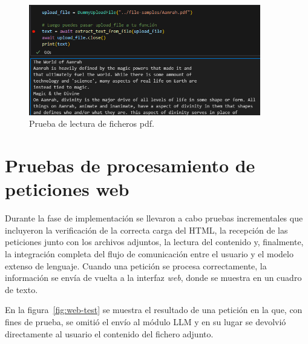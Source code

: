 \begin{figure}[htbp]
	\centering
	\includegraphics[width=0.9\textwidth]{./Figures/file-read-test-pdf.png}
	\caption{Prueba de lectura de ficheros pdf.}
	\label{fig:pdf-read-test}
\end{figure}

\pagebreak
\section{Pruebas de procesamiento de peticiones web}
Durante la fase de implementación se llevaron a cabo pruebas incrementales que incluyeron
la verificación de la correcta carga del HTML, la recepción de las peticiones junto con los archivos adjuntos,
la lectura del contenido y, finalmente,
la integración completa del flujo de comunicación entre el usuario y el modelo extenso de lenguaje.
Cuando una petición se procesa correctamente, la información se envía de vuelta a la interfaz \textit{web},
donde se muestra en un cuadro de texto.

En la figura~\ref{fig:web-test} se muestra el resultado de una petición en la que,
con fines de prueba, se omitió el envío al módulo LLM
y en su lugar se devolvió directamente al usuario el contenido del fichero adjunto.

